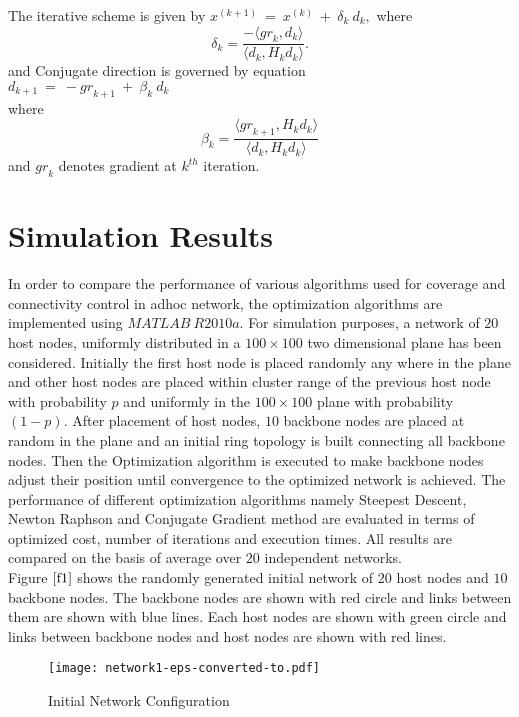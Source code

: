 \documentclass[11pt]{article}
\numberwithin{equation}{section}
\begin{document}
The iterative scheme is given by $x^{(k+1)} ~=~ x^{(k)} ~+~ \delta_k ~d_k,$ where
\begin{equation*}
\delta_k = \frac{- \langle {gr}_k,d_k \rangle}{\langle d_k,H_k d_k \rangle}.
\end{equation*}
and Conjugate direction is governed by equation\\
$d_{k+1}~ =~ -{gr}_{k+1}~ +~ \beta_k~d_k$\\

where
\begin{equation*}
\beta_k = \frac{\langle {gr}_{k+1},H_k d_k \rangle}{\langle d_k,H_k d_k \rangle}
\end{equation*} and ${gr}_k$ denotes gradient at $k^{th}$ iteration.


\newpage

\section{Simulation Results}

   In order to compare the performance of various algorithms used for coverage and connectivity control in adhoc network, the optimization algorithms are implemented using $MATLAB ~R2010a$. For simulation purposes, a network of $20$ host nodes, uniformly distributed in a $100 \times 100$ two dimensional plane has been considered. Initially the first host node is placed randomly any where in the plane and other host nodes are placed within cluster range of the previous host node with probability $p$ and uniformly in the $100 \times 100$ plane with probability $(1 - p)$.  After placement of host nodes, $10$ backbone nodes are placed at random in the plane and an initial ring topology is built connecting all backbone nodes. Then the Optimization algorithm is executed to make backbone nodes adjust their position until convergence to the optimized network is achieved. The performance of different optimization algorithms namely Steepest Descent, Newton Raphson and Conjugate Gradient method are evaluated in terms of optimized cost, number of iterations and execution times. All results are compared on the basis of average over $20$ independent networks.\\

 Figure $\ref{f1}$ shows the randomly generated initial network of $20$ host nodes and $10$ backbone nodes. The backbone nodes are shown with red circle and links between them are shown with blue lines. Each host nodes are shown with green circle and links between backbone nodes and host nodes are shown with red lines.\\
\begin{figure}[htb!]
\begin{center}
\texttt{[image: network1-eps-converted-to.pdf]}
\end{center}
\caption{Initial Network Configuration}\label{f1}
\end{figure}
\end{document}

